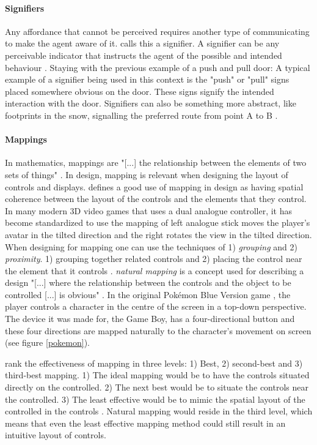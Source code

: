 \paragraph{Signifiers} Any affordance that cannot be perceived requires another type of communicating to make the agent aware of it.  calls this a signifier. A signifier can be any perceivable indicator that instructs the agent of the possible and intended behaviour \cite{norman}. Staying with the previous example of a push and pull door: A typical example of a signifier being used in this context is the "push" or "pull" signs placed somewhere obvious on the door. These signs signify the intended interaction with the door. Signifiers can also be something more abstract, like footprints in the snow, signalling the preferred route from point A to B \cite{norman}.
\paragraph{Mappings} In mathematics, mappings are "[...] the relationship between the elements of two sets of things" \cite[p. 20]{norman}. In design, mapping is relevant when designing the layout of controls and displays.  defines a good use of mapping in design as having spatial coherence between the layout of the controls and the elements that they control. In many modern 3D video games that uses a dual analogue controller, it has become standardized to use the mapping of left analogue stick moves the player's avatar in the tilted direction and the right rotates the view in the tilted direction. When designing for mapping one can use the techniques of 1) \textit{grouping} and 2) \textit{proximity}. 1) grouping together related controls and 2) placing the control near the element that it controls \cite{norman}. \textit{natural mapping} \cite{norman} is a concept used for describing a design "[...] where the relationship between the controls and the object to be controlled [...] is obvious" \cite[p. 115]{norman}. In the original Pokémon Blue Version game \cite{pokemon}, the player controls a character in the centre of the screen in a top-down perspective. The device it was made for, the Game Boy, has a four-directional button and these four directions are mapped naturally to the character's movement on screen (see figure \ref{pokemon}).

 rank the effectiveness of mapping in three levels: 1) Best, 2) second-best and 3) third-best mapping. 1) The ideal mapping would be to have the controls situated directly on the controlled. 2) The next best would be to situate the controls near the controlled. 3) The least effective would be to mimic the spatial layout of the controlled in the controls \cite{norman}. Natural mapping would reside in the third level, which means that even the least effective mapping method could still result in an intuitive layout of controls.

